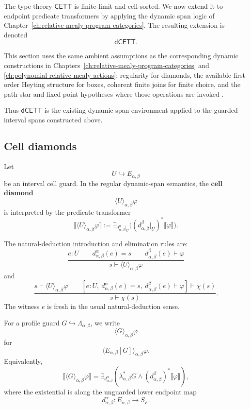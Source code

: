 The type theory \(\mathsf{CETT}\) is finite-limit and cell-sorted. We now
extend it to endpoint predicate transformers by applying the dynamic span logic
of Chapter~\ref{ch:relative-mealy-program-categories}. The resulting
extension is denoted
\[
    \mathsf{dCETT}.
\]

This section uses the same ambient assumptions as the corresponding dynamic
constructions in Chapters~\ref{ch:relative-mealy-program-categories} and
\ref{ch:polynomial-relative-mealy-actions}: regularity for diamonds, the
available first-order Heyting structure for boxes, coherent finite joins for
finite choice, and the path-star and fixed-point hypotheses where those
operations are invoked
\cite{FischerLadner1979,HarelKozenTiurynDynamicLogic,Kozen1997,Jacobs1999CategoricalLogic,FongSpivakRegularRelational}.

Thus \(\mathsf{dCETT}\) is the existing dynamic-span environment applied to
the guarded interval spans constructed above.

\subsection{Cell diamonds}
\label{subsec:cmett-cell-diamonds}

\begin{definition}
\label{def:cmett-cell-diamond}
    Let
    \[
        U\hookrightarrow E_{\alpha,\beta}
    \]
    be an interval cell guard. In the regular dynamic-span semantics, the
    \textbf{cell diamond}
    \[
        \langle U\rangle_{\alpha,\beta}\varphi
    \]
    is interpreted by the predicate transformer
    \[
        \llbracket\langle U\rangle_{\alpha,\beta}\varphi\rrbracket
        :=
        \exists_{d_{\alpha,\beta}^{\alpha}|_U}
        \bigl((d_{\alpha,\beta}^{\beta}|_U)^*
        \llbracket\varphi\rrbracket\bigr).
    \]
\end{definition}

The natural-deduction introduction and elimination rules are:
\[
\frac{
    e:U
    \qquad
    d_{\alpha,\beta}^{\alpha}(e)=s
    \qquad
    d_{\alpha,\beta}^{\beta}(e)\vdash\varphi
}{
    s\vdash\langle U\rangle_{\alpha,\beta}\varphi
}
\]
and
\[
\frac{
    s\vdash\langle U\rangle_{\alpha,\beta}\varphi
    \qquad
    \left[
    e:U,\ 
    d_{\alpha,\beta}^{\alpha}(e)=s,\ 
    d_{\alpha,\beta}^{\beta}(e)\vdash\varphi
    \right]\vdash\chi(s)
}{
    s\vdash\chi(s)
}.
\]
The witness \(e\) is fresh in the usual natural-deduction sense.

For a profile guard \(G\hookrightarrow\Lambda_{\alpha,\beta}\), we write
\[
    \langle G\rangle_{\alpha,\beta}\varphi
\]
for
\[
    \langle E_{\alpha,\beta}[G]\rangle_{\alpha,\beta}\varphi.
\]
Equivalently,
\[
    \llbracket\langle G\rangle_{\alpha,\beta}\varphi\rrbracket
    =
    \exists_{d_{\alpha,\beta}^{\alpha}}
    \left(
        \lambda_{\alpha,\beta}^*G
        \wedge
        (d_{\alpha,\beta}^{\beta})^*\llbracket\varphi\rrbracket
    \right),
\]
where the existential is along the unguarded lower endpoint map
\[
    d_{\alpha,\beta}^{\alpha}:E_{\alpha,\beta}\to S_F.
\]

